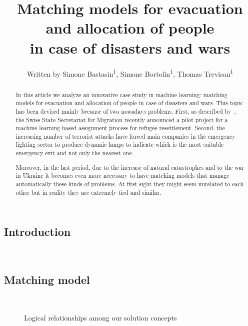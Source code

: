 \documentclass[letterpaper]{article} %
\title{Matching models for evacuation and allocation of people\\in case of disasters and wars}
\author{
    Written by Simone Bastasin\textsuperscript{\rm 1}, Simone Bortolin\textsuperscript{\rm 1}, Thomas Trevisan\textsuperscript{\rm 1}
    \\
}
\begin{document}
    \maketitle

    \begin{abstract}
        In this article we analyze an innovative case study in machine learning: matching models for evacuation and allocation of people in case of disasters and wars. This topic has been devised mainly because of two nowadays problems. First, as described by~\citet{olbergml}, the Swiss State Secretariat for Migration recently announced a pilot project for a machine learning-based assignment process for refugee resettlement. Second, the increasing number of terrorist attacks have forced main companies in the emergency lighting sector to produce dynamic lamps to indicate which is the most suitable emergency exit and not only the nearest one.

        Moreover, in the last period, due to the increase of natural catastrophes and to the war in Ukraine it becomes even more necessary to have matching models that manage automatically  these kinds of problems. At first sight they might seem unrelated to each other but in reality they are extremely tied and similar.
    \end{abstract}

    \subsection{Introduction}\label{introduction}
    ~\citet{olbergml,basshuysen,delacretaz_2020,andersson_2018,andersson_2016}

    \subsection{Matching model}\label{matching-model}%
    ~\citet{olbergml,basshuysen,delacretaz_2020}

    \begin{figure}[!htb]
        \def\svgwidth{\columnwidth}
        
        \caption{Logical relationships among our solution concepts}
        \label{fig:matching}
    \end{figure}
\end{document}
